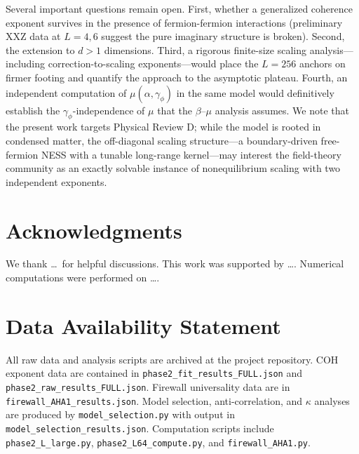 \documentclass[aps,prd,twocolumn,superscriptaddress,floatfix]{revtex4-2}
\begin{document}
Several important questions remain open. First, whether a generalized
coherence exponent survives in the presence of fermion-fermion
interactions (preliminary XXZ data at $L = 4, 6$ suggest the pure
imaginary structure is broken). Second, the extension to $d > 1$
dimensions. Third, a rigorous finite-size scaling
analysis---including correction-to-scaling exponents---would place the
$L=256$ anchors on firmer footing and quantify the approach to the
asymptotic plateau. Fourth, an independent computation of
$\mu(\alpha,\gamma_\phi)$ in the same model would definitively
establish the $\gamma_\phi$-independence of $\mu$ that the
$\beta$--$\mu$ analysis assumes. We note that the present work targets
Physical Review D; while the model is rooted in condensed matter, the
off-diagonal scaling structure---a boundary-driven free-fermion NESS
with a tunable long-range kernel---may interest the field-theory
community as an exactly solvable instance of nonequilibrium scaling
with two independent exponents.

\section*{Acknowledgments}

We thank \dots\ for helpful discussions. This work was supported by
\dots. Numerical computations were performed on \dots.

\section*{Data Availability Statement}

All raw data and analysis scripts are archived at the project
repository. COH exponent data are contained in
\texttt{phase2\_fit\_results\_FULL.json} and
\texttt{phase2\_raw\_results\_FULL.json}. Firewall universality data
are in \texttt{firewall\_AHA1\_results.json}. Model selection,
anti-correlation, and $\kappa$ analyses are produced by
\texttt{model\_selection.py} with output in
\texttt{model\_selection\_results.json}. Computation scripts include
\texttt{phase2\_L\_large.py}, \texttt{phase2\_L64\_compute.py}, and
\texttt{firewall\_AHA1.py}.

\end{document}
